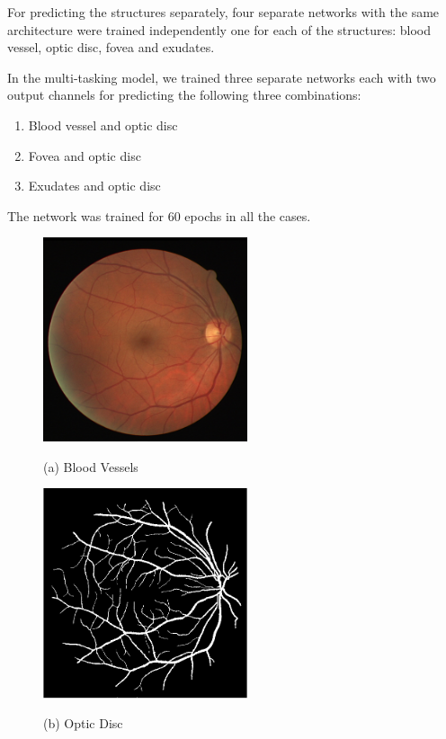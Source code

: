 \documentclass{article}
\begin{document}
For predicting the structures separately, four separate networks with the same architecture were trained independently one for each of the structures: blood vessel, optic disc, fovea and exudates.

In the multi-tasking model, we trained three separate networks each with two output channels for predicting the following three combinations:
\begin{enumerate}
\item Blood vessel and  optic disc
\item Fovea and optic disc
\item Exudates and optic disc
\end{enumerate}

The network was trained for 60 epochs in all the cases.

\begin{figure}[!ht]
\begin{minipage}[b]{0.7\linewidth}
\centering
\centerline{\includegraphics[width=6cm]{images/19_test_img.png}}
\centerline{(a) Blood Vessels}\medskip
\end{minipage}

\begin{minipage}[b]{0.7\linewidth}
\centering
\centerline{\includegraphics[width=6cm]{images/19_test_gt.png}}
\centerline{(b) Optic Disc}\medskip
\end{minipage}


\end{figure}
\end{document}
